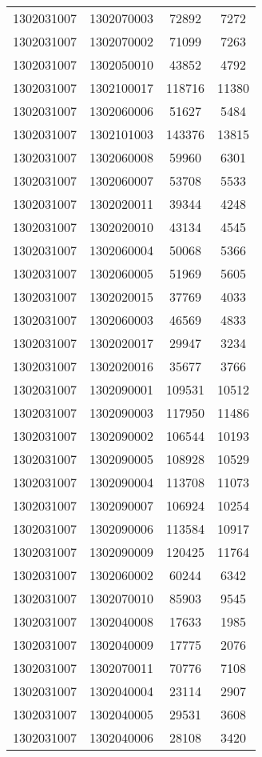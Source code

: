 \begin{longtable}{llcc}
1302031007 & 1302070003 & 72892 & 7272\\
1302031007 & 1302070002 & 71099 & 7263\\
1302031007 & 1302050010 & 43852 & 4792\\
1302031007 & 1302100017 & 118716 & 11380\\
1302031007 & 1302060006 & 51627 & 5484\\
1302031007 & 1302101003 & 143376 & 13815\\
1302031007 & 1302060008 & 59960 & 6301\\
1302031007 & 1302060007 & 53708 & 5533\\
1302031007 & 1302020011 & 39344 & 4248\\
1302031007 & 1302020010 & 43134 & 4545\\
1302031007 & 1302060004 & 50068 & 5366\\
1302031007 & 1302060005 & 51969 & 5605\\
1302031007 & 1302020015 & 37769 & 4033\\
1302031007 & 1302060003 & 46569 & 4833\\
1302031007 & 1302020017 & 29947 & 3234\\
1302031007 & 1302020016 & 35677 & 3766\\
1302031007 & 1302090001 & 109531 & 10512\\
1302031007 & 1302090003 & 117950 & 11486\\
1302031007 & 1302090002 & 106544 & 10193\\
1302031007 & 1302090005 & 108928 & 10529\\
1302031007 & 1302090004 & 113708 & 11073\\
1302031007 & 1302090007 & 106924 & 10254\\
1302031007 & 1302090006 & 113584 & 10917\\
1302031007 & 1302090009 & 120425 & 11764\\
1302031007 & 1302060002 & 60244 & 6342\\
1302031007 & 1302070010 & 85903 & 9545\\
1302031007 & 1302040008 & 17633 & 1985\\
1302031007 & 1302040009 & 17775 & 2076\\
1302031007 & 1302070011 & 70776 & 7108\\
1302031007 & 1302040004 & 23114 & 2907\\
1302031007 & 1302040005 & 29531 & 3608\\
1302031007 & 1302040006 & 28108 & 3420\\

\end{longtable}
